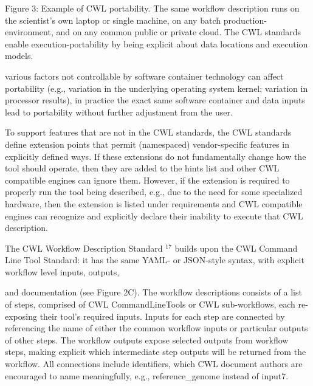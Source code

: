 \documentclass[
]{article}
\begin{document}
Figure 3: Example of CWL portability. The same workflow description runs
on the scientist's own laptop or single machine, on any batch
production-environment, and on any common public or private cloud. The
CWL standards enable execution-portability by being explicit about data
locations and execution models.

various factors not controllable by software container technology can
affect portability (e.g., variation in the underlying operating system
kernel; variation in processor results), in practice the exact same
software container and data inputs lead to portability without further
adjustment from the user.

To support features that are not in the CWL standards, the CWL standards
define extension points that permit (namespaced) vendor-specific
features in explicitly defined ways. If these extensions do not
fundamentally change how the tool should operate, then they are added to
the hints list and other CWL compatible engines can ignore them.
However, if the extension is required to properly run the tool being
described, e.g., due to the need for some specialized hardware, then the
extension is listed under requirements and CWL compatible engines can
recognize and explicitly declare their inability to execute that CWL
description.

The CWL Workflow Description Standard \(^{17}\) builds upon the CWL
Command Line Tool Standard: it has the same YAML- or JSON-style syntax,
with explicit workflow level inputs, outputs,

and documentation (see Figure 2C). The workflow descriptions consists of
a list of steps, comprised of CWL CommandLineTools or CWL sub-workflows,
each re-exposing their tool's required inputs. Inputs for each step are
connected by referencing the name of either the common workflow inputs
or particular outputs of other steps. The workflow outputs expose
selected outputs from workflow steps, making explicit which intermediate
step outputs will be returned from the workflow. All connections include
identifiers, which CWL document authors are encouraged to name
meaningfully, e.g., reference\_genome instead of input7.
\end{document}
